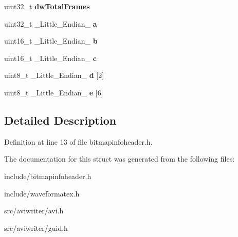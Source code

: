 \begin{DoxyCompactItemize}
\item 
\hypertarget{structGCC__ATTRIBUTE_a0fbe4be54a1e27c17cca3dd74160e93a}{uint32\-\_\-t {\bfseries dw\-Total\-Frames}}\label{structGCC__ATTRIBUTE_a0fbe4be54a1e27c17cca3dd74160e93a}

\item 
\hypertarget{structGCC__ATTRIBUTE_a8016ff5dc7cf21b1a2c4ca68373aafbc}{uint32\-\_\-t \-\_\-\-Little\-\_\-\-Endian\-\_\- {\bfseries a}}\label{structGCC__ATTRIBUTE_a8016ff5dc7cf21b1a2c4ca68373aafbc}

\item 
\hypertarget{structGCC__ATTRIBUTE_aa038ab5ca9ae281b73ea9021dbdff70d}{uint16\-\_\-t \-\_\-\-Little\-\_\-\-Endian\-\_\- {\bfseries b}}\label{structGCC__ATTRIBUTE_aa038ab5ca9ae281b73ea9021dbdff70d}

\item 
\hypertarget{structGCC__ATTRIBUTE_aa3cb6850a0dfa5d9e55b2383d6d95920}{uint16\-\_\-t \-\_\-\-Little\-\_\-\-Endian\-\_\- {\bfseries c}}\label{structGCC__ATTRIBUTE_aa3cb6850a0dfa5d9e55b2383d6d95920}

\item 
\hypertarget{structGCC__ATTRIBUTE_a1a818851c423fab571998ba36c866595}{uint8\-\_\-t \-\_\-\-Little\-\_\-\-Endian\-\_\- {\bfseries d} \mbox{[}2\mbox{]}}\label{structGCC__ATTRIBUTE_a1a818851c423fab571998ba36c866595}

\item 
\hypertarget{structGCC__ATTRIBUTE_a43634af701dc5aec9586f72438f8e859}{uint8\-\_\-t \-\_\-\-Little\-\_\-\-Endian\-\_\- {\bfseries e} \mbox{[}6\mbox{]}}\label{structGCC__ATTRIBUTE_a43634af701dc5aec9586f72438f8e859}

\end{DoxyCompactItemize}


\subsection{Detailed Description}


Definition at line 13 of file bitmapinfoheader.\-h.



The documentation for this struct was generated from the following files\-:\begin{DoxyCompactItemize}
\item 
include/bitmapinfoheader.\-h\item 
include/waveformatex.\-h\item 
src/aviwriter/avi.\-h\item 
src/aviwriter/guid.\-h\end{DoxyCompactItemize}
